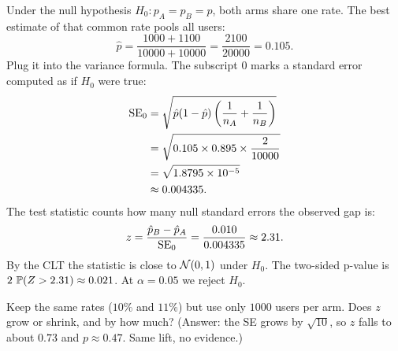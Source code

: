 Under the null hypothesis $H_0\colon p_A = p_B = p$, both arms share one rate.
The best estimate of that common rate pools all users:
\[
  \hat p = \frac{1000 + 1100}{10000 + 10000} = \frac{2100}{20000} = 0.105.
\]
Plug it into the variance formula. The subscript $0$ marks a standard error
computed as if $H_0$ were true:
\begin{align*}
  \SE_0 &= \sqrt{\hat p(1-\hat p)\left(\frac{1}{n_A}+\frac{1}{n_B}\right)} \\
        &= \sqrt{0.105 \times 0.895 \times \frac{2}{10000}} \\
        &= \sqrt{1.8795\times 10^{-5}} \\
        &\approx 0.004335.
\end{align*}
The test statistic counts how many null standard errors the observed gap is:
\[
  z = \frac{\hat p_B - \hat p_A}{\SE_0} = \frac{0.010}{0.004335} \approx 2.31.
\]
By the CLT the statistic is close to $\Normal(0,1)$ under $H_0$. The two-sided
p-value is $2\,\P(Z > 2.31) \approx 0.021$. At $\alpha = 0.05$ we reject $H_0$.

\begin{recoverybox}
Keep the same rates ($10\%$ and $11\%$) but use only $1000$
users per arm. Does $z$ grow or shrink, and by how much? (Answer: the SE grows
by $\sqrt{10}$, so $z$ falls to about $0.73$ and $p \approx 0.47$. Same lift, no
evidence.)
\end{recoverybox}

